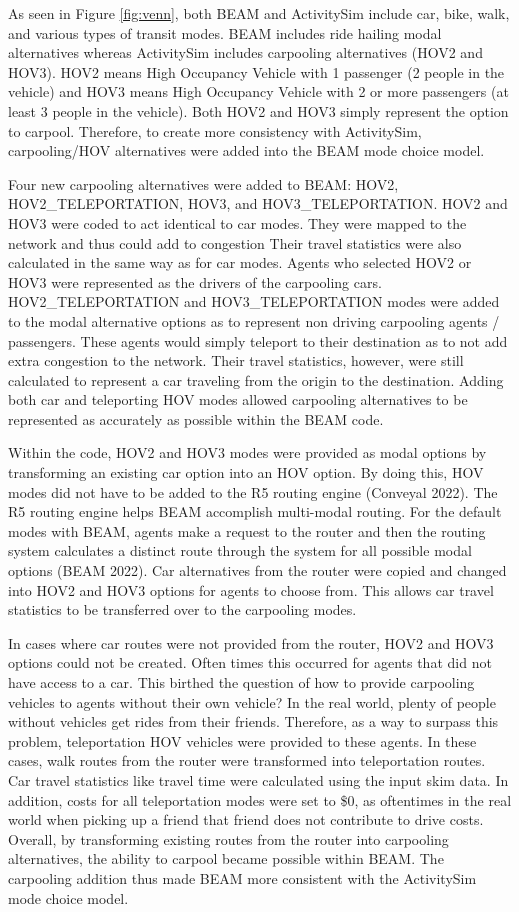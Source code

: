 \documentclass[12pt, oneside, openright]{byuthesis}
\begin{document}
As seen in Figure \ref{fig:venn}, both BEAM and ActivitySim include car, bike, walk, and various types of transit modes. BEAM includes ride hailing modal alternatives whereas ActivitySim includes carpooling alternatives (HOV2 and HOV3). HOV2 means High Occupancy Vehicle with 1 passenger (2 people in the vehicle) and HOV3 means High Occupancy Vehicle with 2 or more passengers (at least 3 people in the vehicle). Both HOV2 and HOV3 simply represent the option to carpool. Therefore, to create more consistency with ActivitySim, carpooling/HOV alternatives were added into the BEAM mode choice model.

Four new carpooling alternatives were added to BEAM: HOV2, HOV2\_TELEPORTATION, HOV3, and HOV3\_TELEPORTATION. HOV2 and HOV3 were coded to act identical to car modes. They were mapped to the network and thus could add to congestion Their travel statistics were also calculated in the same way as for car modes. Agents who selected HOV2 or HOV3 were represented as the drivers of the carpooling cars. HOV2\_TELEPORTATION and HOV3\_TELEPORTATION modes were added to the modal alternative options as to represent non driving carpooling agents / passengers. These agents would simply teleport to their destination as to not add extra congestion to the network. Their travel statistics, however, were still calculated to represent a car traveling from the origin to the destination. Adding both car and teleporting HOV modes allowed carpooling alternatives to be represented as accurately as possible within the BEAM code.

Within the code, HOV2 and HOV3 modes were provided as modal options by transforming an existing car option into an HOV option. By doing this, HOV modes did not have to be added to the R5 routing engine (Conveyal 2022). The R5 routing engine helps BEAM accomplish multi-modal routing. For the default modes with BEAM, agents make a request to the router and then the routing system calculates a distinct route through the system for all possible modal options (BEAM 2022). Car alternatives from the router were copied and changed into HOV2 and HOV3 options for agents to choose from. This allows car travel statistics to be transferred over to the carpooling modes.

In cases where car routes were not provided from the router, HOV2 and HOV3 options could not be created. Often times this occurred for agents that did not have access to a car. This birthed the question of how to provide carpooling vehicles to agents without their own vehicle? In the real world, plenty of people without vehicles get rides from their friends. Therefore, as a way to surpass this problem, teleportation HOV vehicles were provided to these agents. In these cases, walk routes from the router were transformed into teleportation routes. Car travel statistics like travel time were calculated using the input skim data. In addition, costs for all teleportation modes were set to \$0, as oftentimes in the real world when picking up a friend that friend does not contribute to drive costs. Overall, by transforming existing routes from the router into carpooling alternatives, the ability to carpool became possible within BEAM. The carpooling addition thus made BEAM more consistent with the ActivitySim mode choice model.
\end{document}
